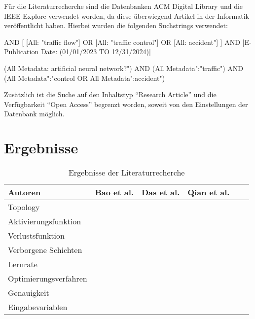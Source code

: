 \documentclass{scrartcl}
\begin{document}
Für die Literaturrecherche sind die Datenbanken ACM Digital Library und die
IEEE Explore verwendet worden, da diese überwiegend Artikel in der Informatik
veröffentlicht haben.
Hierbei wurden die folgenden Suchstrings verwendet:

\begin{tcolorbox}
   AND [
         [All: "traffic flow"]
         OR [All: "traffic control"]
         OR [All: \dq accident"]
      ]
   AND [E-Publication Date: (01/01/2023 TO 12/31/2024)]
\end{tcolorbox}

\begin{tcolorbox}[
      enhanced,
      attach boxed title to top left,
      colback=gray!20,
      colframe=gray,
      colbacktitle=gray,
      title=IEEE Explore,
      fonttitle=\bfseries\color{black},
      boxed title style={size=small, colframe=gray, sharp corners},
      sharp corners
   ]
   (\dq All Metadata\dq: \dq artificial neural network?")
   AND (\dq All Metadata":"traffic")
   AND (\dq All Metadata":"control\dq\space
   OR \dq All Metadata":\dq accident")
\end{tcolorbox}

Zusätzlich ist die Suche auf den Inhaltstyp \enquote{Research Article}
und die Verfügbarkeit \enquote{Open Access} begrenzt worden, soweit von
den Einstellungen der Datenbank möglich.


\section{Ergebnisse}

\begin{table}[!h]
   \centering
   \caption{Ergebnisse der Literaturrecherche}
   \label{tab1}
   \begin{tabular}{lccccr} \toprule
      Autoren               & Bao et al. & Das et al. & Qian et al. \\ \midrule
      Topology              &            &            &             \\
      Aktivierungsfunktion  &            &            &             \\
      Verlustsfunktion      &            &            &             \\
      Verborgene Schichten  &            &            &             \\
      Lernrate              &            &            &             \\
      Optimierungsverfahren &            &            &             \\
      Genauigkeit           &            &            &             \\
      Eingabevariablen      &            &            &             \\ \bottomrule
   \end{tabular}
\end{table}
\end{document}

